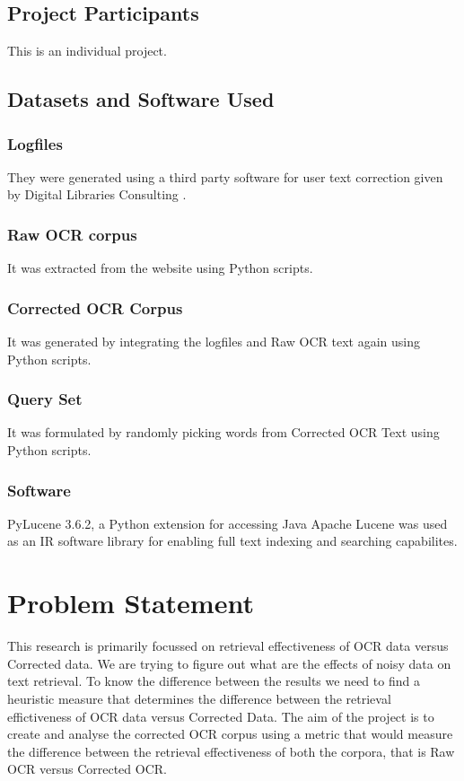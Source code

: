 \documentclass[10pt, conference, compsocconf]{IEEEtran}
\begin{document}
\subsection{Project Participants}
This is an individual project.

\subsection{Datasets and Software Used}
\subsubsection{Logfiles}
They were generated using a third party software for user text correction given by Digital Libraries Consulting \cite{digital}.\\
\subsubsection{Raw OCR corpus}
It was extracted from the website \cite{datasource} using Python scripts.\\
\subsubsection{Corrected OCR Corpus}
It was generated by integrating the logfiles and Raw OCR text again using Python scripts.\\
\subsubsection{Query Set}
It was formulated by randomly picking words from Corrected OCR Text using Python scripts.\\
\subsubsection {Software}
PyLucene 3.6.2, a Python extension for accessing Java Apache Lucene was used as an IR software library for enabling full text indexing and searching capabilites.\\


\section{Problem Statement}
This research is primarily focussed on retrieval effectiveness of OCR data versus Corrected data. We are trying to figure out what are the effects of noisy data on text retrieval. To know the difference between the results we need to find a heuristic measure that determines the difference between the retrieval effictiveness of OCR data versus Corrected Data. The aim of the project is to create and analyse the corrected OCR corpus using a metric that would measure the difference between the retrieval effectiveness of both the corpora, that is Raw OCR versus Corrected OCR.
\end{document}
